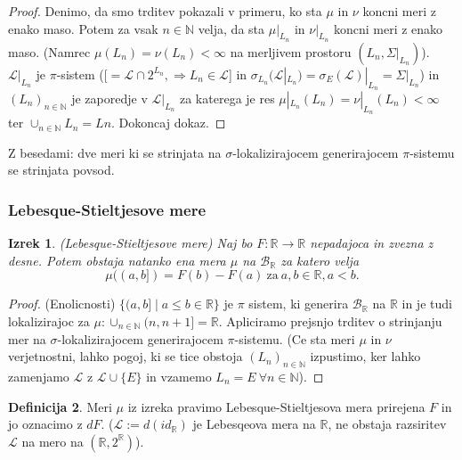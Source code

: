 \documentclass[a4paper,12pt]{article}
\theoremstyle{definition} %
\newtheorem{definicija}{Definicija}[section]
\theoremstyle{plain} %
\newtheorem{izrek}[definicija]{Izrek}
\newcommand{\R}{\mathbb{R}}
\newcommand{\N}{\mathbb{N}}
\begin{document}
            \begin{proof}
                Denimo, da smo trditev pokazali v primeru, ko sta $\mu$ in $\nu$ koncni
                meri z enako maso. Potem za vsak $n \in \N$ velja, da sta $\mu|_{L_n}$ in
                $\nu|_{L_n}$ koncni meri z enako maso. (Namrec $\mu(L_n) = \nu(L_n) < \infty$ na merljivem 
                prostoru $(L_n, \Sigma|_{L_n})$). $\mathcal{L}|_{L_n}$ je $\pi$-sistem ([$= \mathcal{L} \cap 2^{L_n}, \Rightarrow L_n \in \mathcal{L}$] in $\sigma_{L_n}(\mathcal{L}|_{L_n}) = \sigma_E(\mathcal{L})|_{L_n} = \Sigma|_{L_n}$)
                in $(L_n)_{n\in\N}$ je zaporedje v $\mathcal{L}|_{L_n}$ za katerega je res 
                $\mu|_{L_n}(L_n) = \nu|_{L_n}(L_n)<\infty$ ter $\cup_{n\in\N}L_n=Ln.$
                Dokoncaj dokaz.
            \end{proof}

            Z besedami: dve meri ki se strinjata na $\sigma$-lokalizirajocem generirajocem $\pi$-sistemu se strinjata povsod.

        \subsubsection{Lebesque-Stieltjesove mere}
            \begin{izrek}(Lebesque-Stieltjesove mere)
                Naj bo $F:\R \rightarrow \R$ nepadajoca in zvezna z desne. Potem obstaja natanko ena mera $\mu$ na $\mathcal{B}_\R$ za katero velja
                $$
                    \mu((a, b]) = F(b) - F(a) \ \text{za} \ a, b \in \R, a < b.
                $$
            \end{izrek}

            \begin{proof}(Enolicnosti)
                $\{(a, b]\mid a\leq b \in \R\}$ je $\pi$ sistem, ki generira $\mathcal{B}_\R$ na $\R$
                in je tudi lokalizirajoc za $\mu:\cup_{n\in\N}(n, n+1] = \R$. Apliciramo prejsnjo trditev o 
                strinjanju mer na $\sigma$-lokalizirajocem generirajocem $\pi$-sistemu. (Ce sta meri 
                $\mu$ in $\nu$ verjetnostni, lahko pogoj, ki se tice obstoja $(L_n)_{n\in\N}$ izpustimo, ker 
                lahko zamenjamo $\mathcal{L}$ z $\mathcal{L} \cup \{E\}$ in vzamemo $L_n = E  \ \forall n \in \N$).
            \end{proof}

            \begin{definicija}
                Meri $\mu$ iz izreka pravimo Lebesque-Stieltjesova mera prirejena $F$ in jo oznacimo z $dF$.
                ($\mathcal{L}:= d(id_\R)$ je Lebesqeova mera na $\R$, ne obstaja razsiritev $\mathcal{L}$ na mero na $(\R, 2^\R)$).
            \end{definicija}
\end{document}
